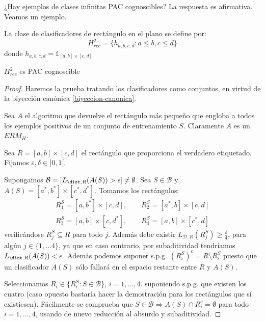 ¿Hay ejemplos de clases infinitas PAC cognoscibles? La respuesta es afirmativa. Veamos un ejemplo.

\begin{example}
  \begin{definition}
  La clase de clasificadores de rectángulo en el plano se define por:
  \[
    H^2_{rec} = \{ h_{a,b,c,d}: a\le b, c\le d\}
  \]
  donde $h_{a,b,c,d} = \mathds{1}_{[a,b]\times [c,d]}$
  \end{definition}


    \begin{fact}
    $H_{rec}^2$ es PAC cognoscible
    \end{fact}

    \begin{proof}
    Haremos la prueba tratando los clasificadores como conjuntos, en virtud de la biyección canónica \ref{biyeccion-canonica}.
    
    Sea $A$ el algoritmo que devuelve el rectángulo más pequeño que engloba a todos los ejemplos positivos de un conjunto 
    de entrenamiento $S$. Claramente $A$ es un $ERM_H$.

    Sea $R= [a,b]\times [c,d]$ el rectángulo que proporciona el verdadero etiquetado. Fijamos $\varepsilon, \delta \in ]0,1[$.
    
    Supongamos $\mathcal{B} = [L_{\dist,R}(A(S)) > \epsilon] \neq \emptyset$. Sea $S\in \mathcal{B}$ y 
    $A(S) = [a^{\ast}, b^{\ast}] \times [c^{\ast}, d^{\ast}]$. Tomamos los rectángulos:
    \begin{align*} 
    R_1^S = [a,b^{\ast}] \times [c,d], \qquad R_2^S = [a^{\ast},b] \times [c,d] \\ 
    R_3^S =[a,b] \times [c,d^{\ast}],   \qquad R_4^S = [a,b] \times [c^{\ast},d]     
    \end{align*}
    verificándose $R_j^S \subseteq R$ para todo $j$. Además debe existir $L_{\mathcal{D},R}(R_j^S) \ge \frac{\varepsilon}{4}$, 
    para algún $j\in \{1, \ldots 4\}$, ya que en caso contrario, por subaditividad tendríamos $L_{\dist,R}(A(S)) < \epsilon$. 
    Además podemos suponer s.p.g. $(R_i^S)^c = R\setminus R_i^S$ puesto que un clasificador $A(S)$ sólo fallará en el
    espacio restante entre $R$ y $A(S)$.
    
    Seleccionamos $R_i \in \{R_i^S: S\in \mathcal{B}\}$, $i=1, \ldots, 4$. suponiendo s.p.g. que existen los cuatro (caso opuesto 
    bastaría hacer la demostración para los rectángulos que sí existiesen). Fácilmente se comprueba que 
    $S\in \mathcal{B} \Rightarrow A(S) \cap R_i^c = \emptyset$ para todo $i=1, \ldots, 4$, usando de nuevo reducción al 
    absurdo y subaditividad.
    

\end{proof}
\end{example}
